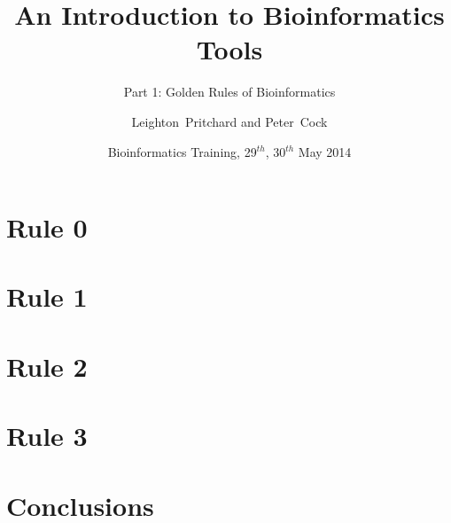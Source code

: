 


\title[Intro to Bioinformatics] %
{An Introduction to Bioinformatics Tools}
\subtitle{Part 1: Golden Rules of Bioinformatics}
\author[Pritchard, Cock] %
{Leighton~Pritchard and Peter~Cock}
\date[May 2014] %
{Bioinformatics Training, 29$^{th}$, 30$^{th}$ May 2014}
\subject{Bioinformatics}





\frame[plain]{\titlepage}
  

   
    
\section{Rule 0}
  

\section{Rule 1}
%
    

\section{Rule 2}
%
    

\section{Rule 3}
%
    

\section{Conclusions}
    

